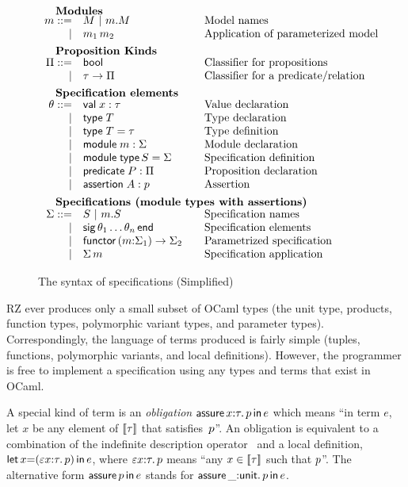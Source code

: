 \begin{figure}
\[\begin{array}{rl@{\qquad}l}
    \noalign{\textbf{Modules}}		
    \om ::= 
    & \oM  \obar \oselect{\om}{\oM}&\mbox{Model names}\\
    | & \oapp{\om_1}{\om_2}&\mbox{Application of parameterized model}\\[5pt]
    
    \noalign{\textbf{Proposition Kinds}}
    \opt ::=
    & \oProp & \mbox{Classifier for propositions}\\
    |& \oarrow{\oty}{\opt} & \mbox{Classifier for a predicate/relation}\\[5pt] 
    
    \noalign{\textbf{Specification elements}}
    \ote ::=
    & \ovalspec{\ox}{\oty}&\mbox{Value declaration}\\
    | & \otyspec{\oTY}&\mbox{Type declaration}\\
    | & \otydef{\oTY}{\oty}&\mbox{Type definition}\\
    | & \omodulespec{\om}{\omt}&\mbox{Module declaration}\\
    | & \osignatdef{\oMT}{\omt}&\mbox{Specification definition}\\
    | & \opropspec{\oP}{\opt}&\mbox{Proposition declaration}\\
    | & \oassertion{\oA}{\op}&\mbox{Assertion}\\[5pt]

    \noalign{\textbf{Specifications (module types with assertions)}}
    \omt ::= 
    & \oMT \obar \oselect{\om}{\oMT} & \mbox{Specification names}\\
    | & \osig{\ote_1 \ldots \ote_n} & \mbox{Specification elements}\\
    | & \ofunctor{\om}{\omt_1}{\omt_2} & \mbox{Parametrized specification}\\
    | & \oapp{\omt}{\om} & \mbox{Specification application}
  \end{array}
  \]
  \label{fig:input}
  \caption{The syntax of specifications (Simplified)}
\end{figure}

RZ ever produces only a small subset of OCaml types (the unit type,
products, function types, polymorphic variant types, and parameter
types). Correspondingly, the language of terms produced is fairly simple
(tuples, functions, polymorphic variants, and local definitions).
However, the programmer is free to implement a specification using any
types and terms that exist in OCaml. 

A special kind of term is an
\emph{obligation} $\mathsf{assure}\,x{:}\tau.\,p\,\mathsf{in}\,e$ which means ``in term
$e$, let $x$ be any element of $[\![\tau]\!]$ that satisfies~$p$''.
An obligation is equivalent to a combination of the indefinite
description operator~\cite{epsilon-reference} and a local definition,
$\mathsf{let}\,x{=}(\varepsilon x {:} \tau.\,p)\,\mathsf{in}\,e$, where
$\varepsilon x {:} \tau.\, p$ means ``any $x \in [\![\tau]\!]$
such that $p$''. The alternative form $\mathsf{assure}\,p\,\mathsf{in}\,e$ stands
for $\mathsf{assure}\,\_{:}\mathsf{unit}.\,p\,\mathsf{in}\,e$. 

